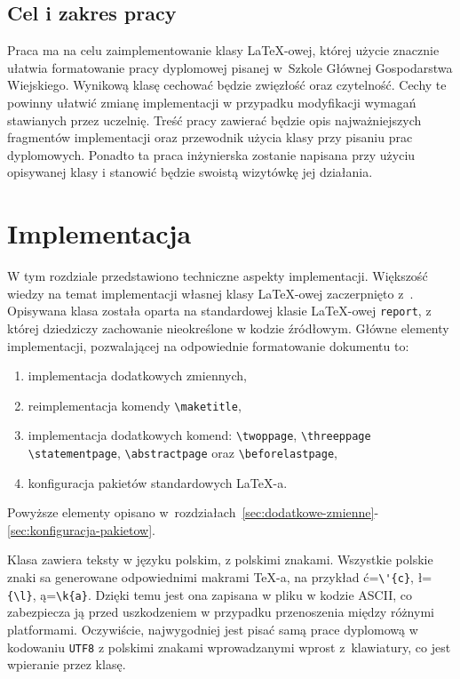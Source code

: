 \documentclass{SGGW-thesis}
\begin{document}
\section{Cel i zakres pracy}
Praca ma na celu zaimplementowanie klasy \LaTeX-owej, której użycie znacznie ułatwia formatowanie pracy dyplomowej pisanej w~Szkole Głównej Gospodarstwa Wiejskiego. Wynikową
klasę cechować będzie zwięzłość oraz czytelność. Cechy te powinny ułatwić zmianę implementacji w przypadku modyfikacji wymagań stawianych przez uczelnię. Treść pracy zawierać
będzie opis najważniejszych fragmentów implementacji oraz przewodnik użycia klasy przy pisaniu prac dyplomowych. Ponadto ta praca inżynierska zostanie napisana przy użyciu
opisywanej klasy i stanowić będzie swoistą wizytówkę jej działania.


\chapter{Implementacja}
W tym rozdziale przedstawiono techniczne aspekty implementacji. Większość wiedzy na temat implementacji własnej klasy \LaTeX-owej zaczerpnięto z~\cite{latexclass}. Opisywana
klasa została oparta na standardowej klasie \LaTeX-owej \verb|report|, z której dziedziczy zachowanie nieokreślone w kodzie źródłowym. Główne elementy implementacji,
pozwalającej na odpowiednie formatowanie dokumentu to:
\begin{enumerate} [label=\alph*.]
\item{implementacja dodatkowych zmiennych,}
\item{reimplementacja komendy \verb|\maketitle|,}
\item{implementacja dodatkowych komend: \verb|\twoppage|, \verb|\threeppage|
\verb|\statementpage|, \verb|\abstractpage| oraz \verb|\beforelastpage|,}
\item{konfiguracja pakietów standardowych \LaTeX-a.}
\end{enumerate}
Powyższe elementy opisano w~rozdziałach~\ref{sec:dodatkowe-zmienne}-\ref{sec:konfiguracja-pakietow}.

Klasa zawiera teksty w języku polskim, z polskimi znakami. Wszystkie polskie znaki sa generowane odpowiednimi makrami \TeX-a, na przykład  ć=\verb|\'{c}|, ł=\verb|{\l}|,
ą=\verb|\k{a}|. Dzięki temu jest ona zapisana w pliku w kodzie ASCII, co zabezpiecza ją przed uszkodzeniem w przypadku przenoszenia między różnymi platformami. Oczywiście,
najwygodniej jest pisać samą prace dyplomową w kodowaniu {\tt UTF8} z polskimi znakami wprowadzanymi wprost z~klawiatury, co jest wpieranie przez klasę.
\end{document}
